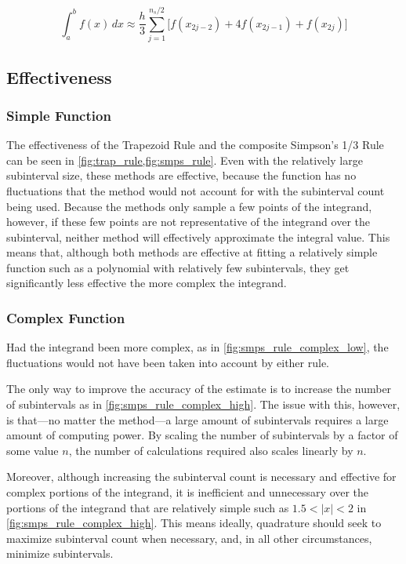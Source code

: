 \documentclass{paper}
\begin{document}
\begin{equation}
    \label{eqn:composite_smps_rule}
    \int_a^b f(x) \,dx \approx \frac{h}{3} \sum_{j=1}^{n_s / 2} \biggl[f(x_{2j-2}) + 4f(x_{2j-1}) + f(x_{2j})\biggr]
\end{equation}

\subsection{Effectiveness}
\label{sec:effectiveness}
\subsubsection{Simple Function}
\label{sec:simple}
The effectiveness of the Trapezoid Rule and the composite Simpson's 1/3 Rule can be seen in \cref{fig:trap_rule,fig:smps_rule}.
Even with the relatively large subinterval size, these methods are effective, because the function has no fluctuations that the method would not account for with the subinterval count being used.
Because the methods only sample a few points of the integrand, however, if these few points are not representative of the integrand over the subinterval, neither method will effectively approximate the integral value.
This means that, although both methods are effective at fitting a relatively simple function such as a polynomial with relatively few subintervals, they get significantly less effective the more complex the integrand.

\subsubsection{Complex Function}
\label{sec:complex_examples}
Had the integrand been more complex, as in \cref{fig:smps_rule_complex_low}, the fluctuations would not have been taken into account by either rule.



The only way to improve the accuracy of the estimate is to increase the number of subintervals as in \cref{fig:smps_rule_complex_high}.
The issue with this, however, is that---no matter the method---a large amount of subintervals requires a large amount of computing power.
By scaling the number of subintervals by a factor of some value \(n\), the number of calculations required also scales linearly by \(n\).



Moreover, although increasing the subinterval count is necessary and effective for complex portions of the integrand, it is inefficient and unnecessary over the portions of the integrand that are relatively simple such as \(1.5 < |x| < 2\) in \cref{fig:smps_rule_complex_high}.
This means ideally, quadrature should seek to maximize subinterval count when necessary, and, in all other circumstances, minimize subintervals.
\end{document}
